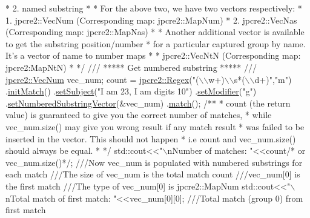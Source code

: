 \begin{DoxyCode}
\textcolor{comment}{ *  2. named substring}
\textcolor{comment}{ * }
\textcolor{comment}{ * For the above two, we have two vectors respectively:}
\textcolor{comment}{ *  1. jpcre2::VecNum (Corresponding map: jpcre2::MapNum)}
\textcolor{comment}{ *  2. jpcre2::VecNas (Corresponding map: jpcre2::MapNas)}
\textcolor{comment}{ * }
\textcolor{comment}{ * Another additional vector is available to get the substring position/number}
\textcolor{comment}{ * for a particular captured group by name. It's a vector of name to number maps}
\textcolor{comment}{ *  * jpcre2::VecNtN (Corresponding map: jpcre2:MapNtN)}
\textcolor{comment}{ * */}
\textcolor{comment}{}
\textcolor{comment}{/// ***** Get numbered substring ***** ///}
\textcolor{comment}{}\hyperlink{namespacejpcre2_ac1cf752c8fbb0be78020be3b80e77ce3}{jpcre2::VecNum} vec\_num;
count = 
\hyperlink{classjpcre2_1_1Regex}{jpcre2::Regex}(\textcolor{stringliteral}{"(\(\backslash\)\(\backslash\)w+)\(\backslash\)\(\backslash\)s*(\(\backslash\)\(\backslash\)d+)"},\textcolor{stringliteral}{"m"})
        .\hyperlink{classjpcre2_1_1Regex_a519b0915bf1163c6ce6a4d674b30cfcd}{initMatch}()
        .\hyperlink{classjpcre2_1_1RegexMatch_a635c652195deaa8ebb9e107c4f972aab}{setSubject}(\textcolor{stringliteral}{"I am 23, I am digits 10"})
        .\hyperlink{classjpcre2_1_1RegexMatch_a9df7e92f96b61553f62720cb8f5f23e5}{setModifier}(\textcolor{stringliteral}{"g"})
        .\hyperlink{classjpcre2_1_1RegexMatch_a2c7efe1ec2e13827f670db4ecedcd0a0}{setNumberedSubstringVector}(&vec\_num)
        .\hyperlink{classjpcre2_1_1RegexMatch_a5868aef3a146594ea1ebef34d122bb33}{match}();\textcolor{comment}{}
\textcolor{comment}{/**}
\textcolor{comment}{* count (the return value) is guaranteed to give you the correct number of matches,}
\textcolor{comment}{* while vec\_num.size() may give you wrong result if any match result}
\textcolor{comment}{* was failed to be inserted in the vector. This should not happen}
\textcolor{comment}{* i.e count and vec\_num.size() should always be equal.}
\textcolor{comment}{* */}
std::cout<<\textcolor{stringliteral}{"\(\backslash\)nNumber of matches: "}<<count\textcolor{comment}{/* or vec\_num.size()*/};
\textcolor{comment}{}
\textcolor{comment}{///Now vec\_num is populated with numbered substrings for each match}
\textcolor{comment}{///The size of vec\_num is the total match count}
\textcolor{comment}{///vec\_num[0] is the first match}
\textcolor{comment}{///The type of vec\_num[0] is jpcre2::MapNum}
\textcolor{comment}{}std::cout<<\textcolor{stringliteral}{"\(\backslash\)nTotal match of first match: "}<<vec\_num[0][0];      \textcolor{comment}{///Total match (group 0) from first match}

\end{DoxyCode}
